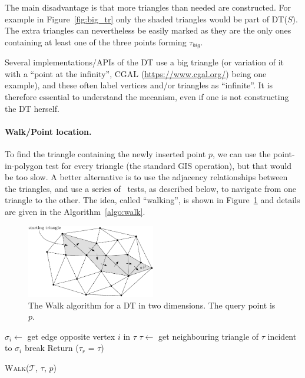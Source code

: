 The main disadvantage is that more triangles than needed are constructed. 
For example in Figure~\ref{fig:big_tr} only the shaded triangles would be part of DT($S$). 
The extra triangles can nevertheless be easily marked as they are the only ones containing at least one of the three points forming $\tau_{big}$. 

\begin{practice-box}
Several implementations/APIs of the DT use a big triangle (or variation of it with a ``point at the infinity'',  CGAL (\url{https://www.cgal.org/}) being one example), and these often label vertices and/or triangles as ``infinite''.
It is therefore essential to understand the mecanism, even if one is not constructing the DT herself.
\end{practice-box}


\paragraph{Walk/Point location.} To find the triangle containing the newly inserted point $p$, we can use the point-in-polygon test for every triangle (the standard GIS operation), but that would be too slow. 
A better alternative is to use the adjacency relationships between the triangles, and use a series of \Orient\ tests, as described below, to navigate from one triangle to the other. 
The idea, called ``walking'', is shown in Figure~\ref{fig:walk} and details are given in the Algorithm~\ref{algo:walk}.
\begin{figure}
  \centering
  \includegraphics[width=0.5\textwidth]{figs/walk}
  \caption{The Walk algorithm for a DT in two dimensions. The query point is $p$.}
\label{fig:walk}
\end{figure}
\begin{algorithm}[t]
  \DontPrintSemicolon
  \BlankLine  
  {
    {
      $\sigma_i \leftarrow$ get edge opposite vertex $i$ in $\tau$\;
      {
        $\tau \leftarrow$ get neighbouring triangle of $\tau$ incident to $\sigma_i$\;
        break\;
      }
    }  
    {
      Return ($\tau_r$ = $\tau$)\;
    }
  }
  \caption{W\textsc{alk}($\mathcal{T}$, $\tau$, $p$)}
\label{algo:walk}
\end{algorithm}
